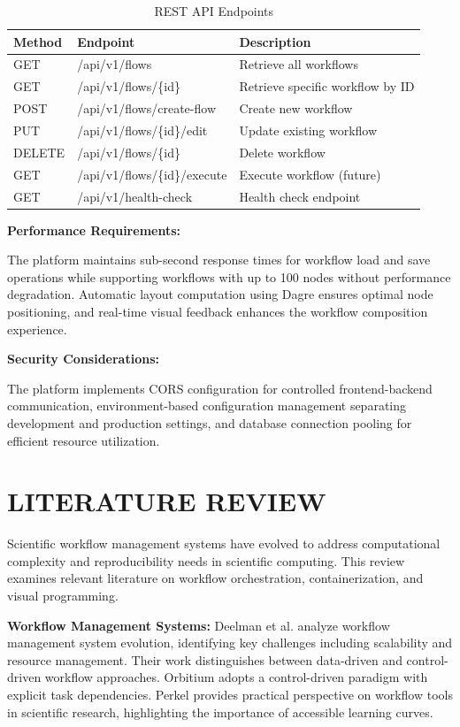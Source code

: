 \documentclass[12pt]{article}
\begin{document}
\begin{table}[h]
\centering
\caption{REST API Endpoints}
\label{tab:api_endpoints}
\begin{tabular}{|l|l|p{6cm}|}
\hline
\textbf{Method} & \textbf{Endpoint} & \textbf{Description} \\
\hline
GET & /api/v1/flows & Retrieve all workflows \\
GET & /api/v1/flows/\{id\} & Retrieve specific workflow by ID \\
POST & /api/v1/flows/create-flow & Create new workflow \\
PUT & /api/v1/flows/\{id\}/edit & Update existing workflow \\
DELETE & /api/v1/flows/\{id\} & Delete workflow \\
GET & /api/v1/flows/\{id\}/execute & Execute workflow (future) \\
GET & /api/v1/health-check & Health check endpoint \\
\hline
\end{tabular}
\end{table}

\textbf{Performance Requirements:}

The platform maintains sub-second response times for workflow load and save operations while supporting workflows with up to 100 nodes without performance degradation. Automatic layout computation using Dagre ensures optimal node positioning, and real-time visual feedback enhances the workflow composition experience.

\textbf{Security Considerations:}

The platform implements CORS configuration for controlled frontend-backend communication, environment-based configuration management separating development and production settings, and database connection pooling for efficient resource utilization.

\newpage
\section{LITERATURE REVIEW}

Scientific workflow management systems have evolved to address computational complexity and reproducibility needs in scientific computing. This review examines relevant literature on workflow orchestration, containerization, and visual programming.

\textbf{Workflow Management Systems:} Deelman et al. \cite{deelman2015future} analyze workflow management system evolution, identifying key challenges including scalability and resource management. Their work distinguishes between data-driven and control-driven workflow approaches. Orbitium adopts a control-driven paradigm with explicit task dependencies. Perkel \cite{perkel2019workflow} provides practical perspective on workflow tools in scientific research, highlighting the importance of accessible learning curves.
\end{document}
